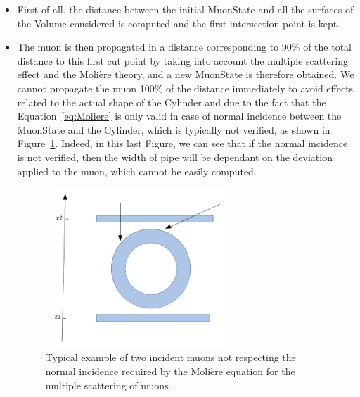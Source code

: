 \documentclass[a4paper, 11pt]{report}
\begin{document}
\begin{itemize}
\item First of all, the distance between the initial MuonState and all the surfaces of the Volume considered is computed and the first intersection point is kept.
\item The muon is then propagated in a distance corresponding to 90\% of the total distance to this first cut point by taking into account the multiple scattering effect and the Moli\`ere theory, and a new MuonState is therefore obtained. We cannot propagate the muon 100\% of the distance immediately to avoid effects related to the actual shape of the Cylinder and due to the fact that the Equation~\ref{eq:Moliere} is only valid in case of normal incidence between the MuonState and the Cylinder, which is typically not verified, as shown in Figure~\ref{fig:normal}. Indeed, in this last Figure, we can see that if the normal incidence is not verified, then the width of pipe will be dependant on the deviation applied to the muon, which cannot be easily computed.

\begin{figure}[htbp]
\centering
\begin{minipage}[b]{.49\textwidth}
\includegraphics[width=7cm, height=6cm]{figs/normal.png}
\end{minipage}\hfill
\caption{Typical example of two incident muons not respecting the normal incidence required by the Moli\`ere equation for the multiple scattering of muons.}
\label{fig:normal}
\end{figure}


\end{itemize}
\end{document}
